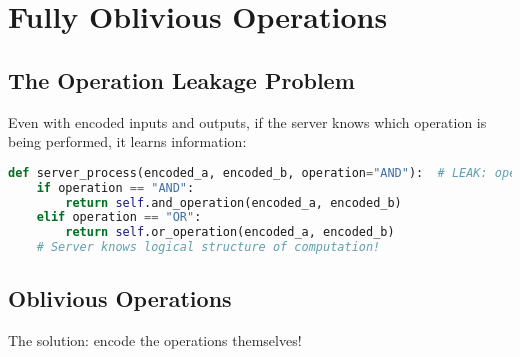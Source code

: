 \section{Fully Oblivious Operations}
\label{sec:fully-oblivious-ops}

\subsection{The Operation Leakage Problem}

Even with encoded inputs and outputs, if the server knows which operation is being performed, it learns information:

\begin{lstlisting}[language=Python, caption={Problem: Operations are observable}]
def server_process(encoded_a, encoded_b, operation="AND"):  # LEAK: operation visible!
    if operation == "AND":
        return self.and_operation(encoded_a, encoded_b)
    elif operation == "OR":
        return self.or_operation(encoded_a, encoded_b)
    # Server knows logical structure of computation!
\end{lstlisting}

\subsection{Oblivious Operations}

The solution: encode the operations themselves!

